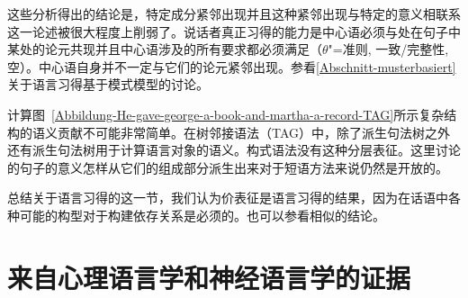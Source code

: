 \begin{exe}
\begin{xlist}[iv.]
\begin{exe}
\begin{xlist}[iv.]
这些分析得出的结论是，特定成分紧邻出现并且这种紧邻出现与特定的意义相联系这一论述被很大程度上削弱了。说话者真正习得的能力是中心语必须与处在句子中某处的论元共现并且中心语涉及的所有要求都必须满足（$\theta$"=准则, 一致/完整性,空\subcatlc）。中心语自身并不一定与它们的论元紧邻出现。参看\ref{Abschnitt-musterbasiert}关于语言习得基于模式模型的讨论。

计算图~\ref{Abbildung-He-gave-george-a-book-and-martha-a-record-TAG}所示复杂结构的语义贡献不可能非常简单。在树邻接语法\indextagc（TAG）中，除了派生句法树之外还有派生句法树用于计算语言对象的语义。构式语法没有这种分层表征。这里讨论的句子的意义怎样从它们的组成部分派生出来对于短语方法来说仍然是开放的。

总结关于语言习得的这一节，我们认为价表征是语言习得的结果，因为在话语中各种可能的构型对于构建依存关系是必须的。也可以参看相似的结论。

\section{来自心理语言学和神经语言学的证据}


\end{xlist}
\end{exe}
\end{xlist}
\end{exe}
